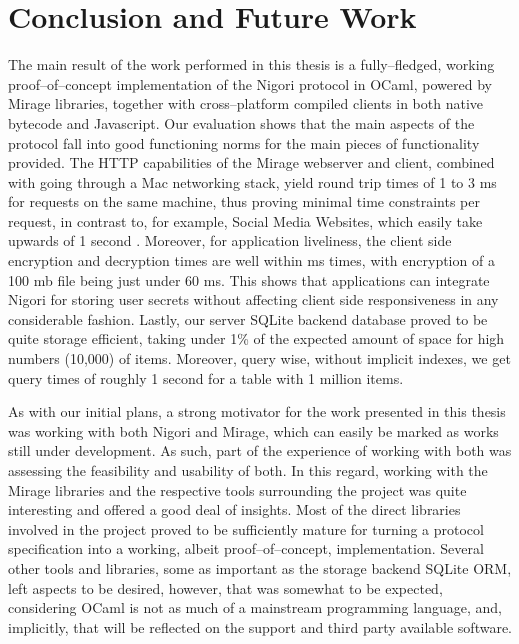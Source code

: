 \chapter{Conclusion and Future Work} \label{chapter:conclusion}
The main result of the work performed in this thesis is a fully--fledged, working proof--of--concept implementation of the Nigori protocol in OCaml, powered by Mirage libraries, together with cross--platform compiled clients in both native bytecode and Javascript.
Our evaluation shows that the main aspects of the protocol fall into good functioning norms for the main pieces of functionality provided.
The HTTP capabilities of the Mirage webserver and client, combined with going through a Mac networking stack, yield round trip times of 1 to 3 ms for requests on the same machine, thus proving minimal time constraints per request, in contrast to, for example, Social Media Websites, which easily take upwards of 1 second \cite{PageLoadTimes}.
Moreover, for application liveliness, the client side encryption and decryption times are well within ms times, with  encryption of a 100 mb file being just under 60 ms.
This shows that applications can integrate Nigori for storing user secrets without affecting client side responsiveness in any considerable fashion.
Lastly, our server SQLite backend database proved to be quite storage efficient, taking under 1\% of the expected amount of space for high numbers (10,000) of items.
Moreover, query wise, without implicit indexes, we get query times of roughly 1 second for a table with 1 million items.

As with our initial plans, a strong motivator for the work presented in this thesis was working with both Nigori and Mirage, which can easily be marked as works still under development.
As such, part of the experience of working with both was assessing the feasibility and usability of both.
In this regard, working with the Mirage libraries and the respective tools surrounding the project was quite interesting and offered a good deal of insights.
Most of the direct libraries involved in the project proved to be sufficiently mature for turning a protocol specification into a working, albeit proof--of--concept, implementation.
Several other tools and libraries, some as important as the storage backend SQLite ORM, left aspects to be desired, however, that was somewhat to be expected, considering OCaml is not as much of a mainstream programming language, and, implicitly, that will be reflected on the support and third party available software.

